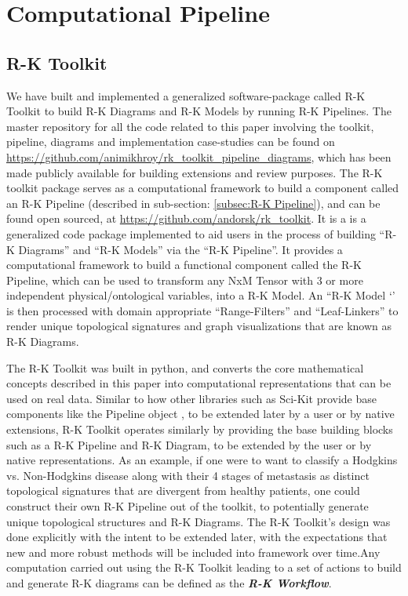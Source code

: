 \section{Computational Pipeline}

\subsection{R-K Toolkit}

 We have built and implemented a generalized software-package called R-K Toolkit \cite{rktoolkit} to build R-K Diagrams and R-K Models by running R-K Pipelines. The master repository for all the code related to this paper involving the toolkit, pipeline, diagrams and implementation case-studies can be found on \url{https://github.com/animikhroy/rk_toolkit_pipeline_diagrams}, which has been made publicly available for building extensions and review purposes. The R-K toolkit package serves as a computational framework to build a component called an R-K Pipeline (described in sub-section: \ref{subsec:R-K Pipeline}), and can be found open sourced, at \url{https://github.com/andorsk/rk_toolkit}. It is a is a generalized code package implemented to aid users in the process of building “R-K Diagrams” and “R-K Models” via the “R-K Pipeline”. It provides a computational framework to build a functional component called the R-K Pipeline, which can be used to transform any NxM Tensor with 3 or more independent physical/ontological variables, into a R-K Model. An “R-K Model ‘’ is then processed with domain appropriate “Range-Filters” and “Leaf-Linkers” to render unique topological signatures and graph visualizations that are known as R-K Diagrams.
 
 The R-K Toolkit was built in python, and converts the core mathematical concepts described in this paper into computational representations that can be used on real data. Similar to how other libraries such as Sci-Kit \cite{a2021_scikitlearn} provide base components like the Pipeline object \cite{a2021_61}, to be extended later by a user or by native extensions, R-K Toolkit operates similarly by providing the base building blocks such as a R-K Pipeline and R-K Diagram, to be extended by the user or by native representations. As an example, if one were to want to classify a Hodgkins vs. Non-Hodgkins disease along with their 4 stages of metastasis as distinct topological signatures that are divergent from healthy patients, one could construct their own R-K Pipeline out of the toolkit, to potentially generate unique topological structures and R-K Diagrams. The R-K Toolkit's design was done explicitly with the intent to be extended later, with the expectations that new and more robust methods will be included into framework over time.Any computation carried out using the R-K Toolkit leading to a set of actions to build and generate R-K diagrams can be defined as the \textbf{\textit{R-K Workflow}}.

